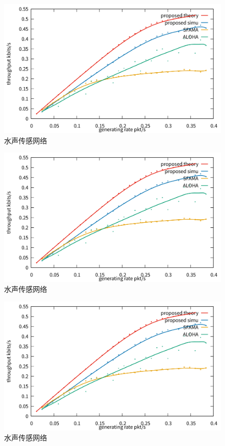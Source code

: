 \begin{figure}[ht]
	\centering
	\includegraphics[scale=0.1]{figures/555.png}
	\caption{
		水声传感网络
	}
	\label{fig:example}
\end{figure}

\begin{figure}[ht]
	\centering
	\includegraphics[scale=0.1]{figures/555.png}
	\caption{
		水声传感网络
	}
	\label{fig:example}
\end{figure}

\begin{figure}[ht]
	\centering
	\includegraphics[scale=0.1]{figures/555.png}
	\caption{
		水声传感网络
	}
	\label{fig:example}
\end{figure}
\endinput